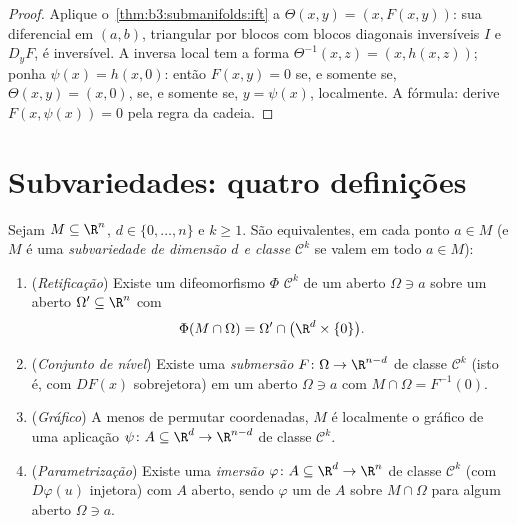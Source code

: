 \begin{proof}
Aplique o~\cref{thm:b3:submanifolds:ift} a $\Theta(x, y) = (x,
F(x,y))$: sua diferencial em $(a,b)$, triangular
por blocos com blocos diagonais inversíveis $I$ e $D_yF$, é
inversível. A inversa local tem a forma $\Theta^{-1}(x, z) = (x, h(x,
z))$; ponha $\psi(x) = h(x, 0)$: então $F(x, y) = 0$ se,
e somente se, $\Theta(x,y) = (x, 0)$, se, e somente se, $y = \psi(x)$, localmente. A fórmula:
derive $F(x, \psi(x)) = 0$ pela regra da cadeia.
\end{proof}

\section{Subvariedades: quatro definições}

\begin{theorem}
\label{thm:b3:submanifolds:characterizations}
Sejam $M \subseteq \R^n$, $d \in \{0, \dots, n\}$ e $k \geq
1$. São equivalentes, em cada ponto $a \in M$ (e $M$
é uma \emph{subvariedade de dimensão $d$ e classe
$\mathcal C^k$} se valem em todo $a
\in M$):
\begin{enumerate}
  \item (\emph{Retificação}) Existe um difeomorfismo $\Phi$ $\mathcal C^k$ de
        um aberto $\Omega \ni a$ sobre um aberto $\Omega' \subseteq \R^n$ com
        \[
        \Phi(M\cap\Omega) = \Omega' \cap
        \bigl(\R^d\times\{0\}\bigr).
        \]
  \item (\emph{Conjunto de nível}) Existe uma \emph{submersão} $F \colon \Omega \to \R^{n-d}$ de
        classe $\mathcal C^k$ (isto é, com $DF(x)$ sobrejetora) em um aberto
        $\Omega \ni a$ com $M\cap\Omega = F^{-1}(0)$.
  \item (\emph{Gráfico}) A menos de permutar coordenadas, $M$ é
        localmente o gráfico de uma aplicação $\psi
        \colon A \subseteq \R^d \to \R^{n-d}$ de classe $\mathcal C^k$.
  \item (\emph{Parametrização}) Existe uma \emph{imersão} $\varphi \colon A \subseteq \R^d \to
        \R^n$ de
        classe $\mathcal C^k$ (com $D\varphi(u)$ injetora) com $A$ aberto, sendo $\varphi$
        um  de $A$ sobre $M \cap
        \Omega$ para algum aberto $\Omega \ni a$.
\end{enumerate}
\end{theorem}

